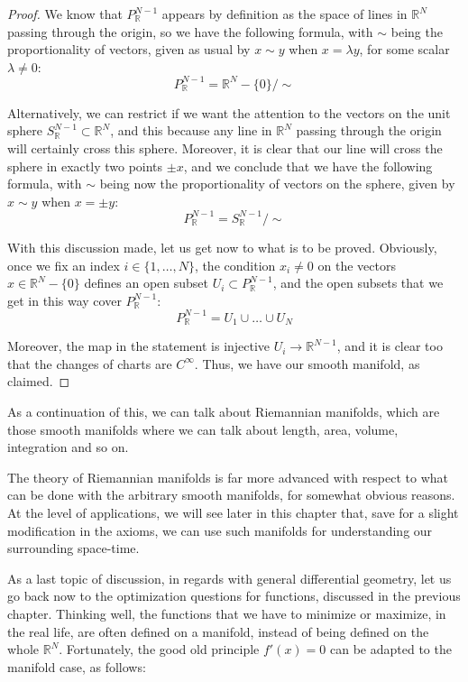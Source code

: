 \documentclass[12pt]{amsbook}
\begin{document}
\begin{proof}
We know that $P^{N-1}_\mathbb R$ appears by definition as the space of lines in $\mathbb R^N$ passing through the origin, so we have the following formula, with $\sim$ being the proportionality of vectors, given as usual by $x\sim y$ when $x=\lambda y$, for some scalar $\lambda\neq0$:
$$P^{N-1}_\mathbb R=\mathbb R^N-\{0\}/\sim$$

Alternatively, we can restrict if we want the attention to the vectors on the unit sphere $S^{N-1}_\mathbb  R\subset\mathbb R^N$, and this because any line in $\mathbb R^N$ passing through the origin will certainly cross this sphere. Moreover, it is clear that our line will cross the sphere in exactly two points $\pm x$, and we conclude that we have the following formula, with $\sim$ being now the proportionality of vectors on the sphere, given by $x\sim y$ when $x=\pm y$:
$$P^{N-1}_\mathbb R=S^{N-1}_\mathbb R/\sim$$

With this discussion made, let us get now to what is to be proved. Obviously, once we fix an index $i\in\{1,\ldots,N\}$, the condition $x_i\neq0$ on the vectors $x\in\mathbb R^N-\{0\}$ defines an open subset $U_i\subset P^{N-1}_\mathbb R$, and the open subsets that we get in this way cover $P^{N-1}_\mathbb R$:
$$P^{N-1}_\mathbb R=U_1\cup\ldots\cup U_N$$

Moreover, the map in the statement is injective $U_i\to\mathbb R^{N-1}$, and it is clear too that the changes of charts are $C^\infty$. Thus, we have our smooth manifold, as claimed.
\end{proof}

As a continuation of this, we can talk about Riemannian manifolds, which are those smooth manifolds where we can talk about length, area, volume, integration and so on. 

\bigskip

The theory of Riemannian manifolds is far more advanced with respect to what can be done with the arbitrary smooth manifolds, for somewhat obvious reasons. At the level of applications, we will see later in this chapter that, save for a slight modification in the axioms, we can use such manifolds for understanding our surrounding space-time.

\bigskip

As a last topic of discussion, in regards with general differential geometry, let us go back now to the optimization questions for functions, discussed in the previous chapter. Thinking well, the functions that we have to minimize or maximize, in the real life, are often defined on a manifold, instead of being defined on the whole $\mathbb R^N$. Fortunately, the good old principle $f'(x)=0$ can be adapted to the manifold case, as follows:
\end{document}
